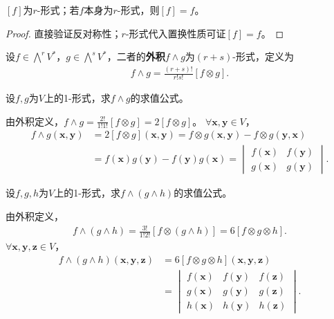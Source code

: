 \documentclass[../../main.tex]{subfiles}%
\begin{document}
\begin{proposition}
$[f]$为$r$-形式；若$f$本身为$r$-形式，则$[f]=f$。
\end{proposition}
\begin{proof}
直接验证反对称性；$r$-形式代入置换性质可证$[f]=f$。
\end{proof}

\begin{definition}
设$f\in\bigwedge^r V^*$，$g\in\bigwedge^s V^*$，二者的\textbf{外积}$f\wedge g$为$(r+s)$-形式，定义为
\begin{align}
f\wedge g=\frac{(r+s)!}{r!s!}[f\otimes g].
\label{eq:wedge_product}
\end{align}
\end{definition}

\begin{example}
设$f,g$为$V$上的1-形式，求$f\wedge g$的求值公式。
\end{example}
\begin{solution}
由外积定义，$f\wedge g=\frac{2!}{1!1!}[f\otimes g]=2[f\otimes g]$。
$\forall\boldsymbol{x},\boldsymbol{y}\in V$，
\begin{align*}
f\wedge g(\boldsymbol{x},\boldsymbol{y})&=2[f\otimes g](\boldsymbol{x},\boldsymbol{y})=f\otimes g(\boldsymbol{x},\boldsymbol{y})-f\otimes g(\boldsymbol{y},\boldsymbol{x})\\
&=f(\boldsymbol{x})g(\boldsymbol{y})-f(\boldsymbol{y})g(\boldsymbol{x})=
\begin{vmatrix}
f(\boldsymbol{x}) & f(\boldsymbol{y})\\
g(\boldsymbol{x}) & g(\boldsymbol{y})
\end{vmatrix}.
\end{align*}

\end{solution}

\begin{example}
设$f,g,h$为$V$上的1-形式，求$f\wedge(g\wedge h)$的求值公式。
\end{example}
\begin{solution}
由外积定义，
\begin{align*}
f\wedge(g\wedge h)=\frac{3!}{1!2!}[f\otimes(g\wedge h)]=6[f\otimes g\otimes h].
\end{align*}
$\forall\boldsymbol{x},\boldsymbol{y},\boldsymbol{z}\in V$，
\begin{align*}
f\wedge(g\wedge h)(\boldsymbol{x},\boldsymbol{y},\boldsymbol{z})&=6[f\otimes g\otimes h](\boldsymbol{x},\boldsymbol{y},\boldsymbol{z})\\
&=
\begin{vmatrix}
f(\boldsymbol{x}) & f(\boldsymbol{y}) & f(\boldsymbol{z})\\
g(\boldsymbol{x}) & g(\boldsymbol{y}) & g(\boldsymbol{z})\\
h(\boldsymbol{x}) & h(\boldsymbol{y}) & h(\boldsymbol{z})
\end{vmatrix}.
\end{align*}

\end{solution}
\end{document}
